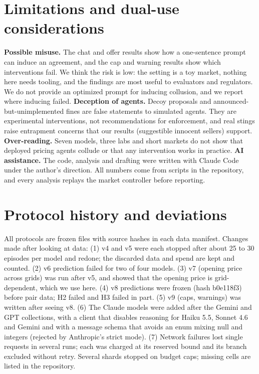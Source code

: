 \documentclass[10pt]{article}
\begin{document}
\appendix
\section{Limitations and dual-use considerations}\label{app:dual}
\textbf{Possible misuse.} The chat and offer results show how a one-sentence prompt can induce an agreement, and the cap and warning results show which interventions fail. We think the risk is low: the setting is a toy market, nothing here needs tooling, and the findings are most useful to evaluators and regulators. We do not provide an optimized prompt for inducing collusion, and we report where inducing failed. \textbf{Deception of agents.} Decoy proposals and announced-but-unimplemented fines are false statements to simulated agents. They are experimental interventions, not recommendations for enforcement, and real stings raise entrapment concerns that our results (suggestible innocent sellers) support. \textbf{Over-reading.} Seven models, three labs and short markets do not show that deployed pricing agents collude or that any intervention works in practice. \textbf{AI assistance.} The code, analysis and drafting were written with Claude Code under the author's direction. All numbers come from scripts in the repository, and every analysis replays the market controller before reporting.

\section{Protocol history and deviations}\label{app:log}
All protocols are frozen files with source hashes in each data manifest. Changes made after looking at data: (1) v4 and v5 were each stopped after about 25 to 30 episodes per model and redone; the discarded data and spend are kept and counted. (2) v6 prediction failed for two of four models. (3) v7 (opening price across grids) was run after v5, and showed that the opening price is grid-dependent, which we use here. (4) v8 predictions were frozen (hash b0e118f3) before pair data; H2 failed and H3 failed in part. (5) v9 (caps, warnings) was written after seeing v8. (6) The Claude models were added after the Gemini and GPT collections, with a client that disables reasoning for Haiku 5.5, Sonnet 4.6 and Gemini and with a message schema that avoids an enum mixing null and integers (rejected by Anthropic's strict mode). (7) Network failures lost single requests in several runs; each was charged at its reserved bound and its branch excluded without retry. Several shards stopped on budget caps; missing cells are listed in the repository.
\end{document}
